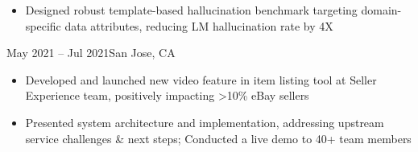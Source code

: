 \begin{itemize}

    \item Designed robust template-based hallucination benchmark targeting domain-specific data attributes,
    reducing LM hallucination rate by 4X



\end{itemize}
\dividerSmall


    {}
    {May 2021 -- Jul 2021}{San Jose, CA}{}
\begin{itemize}

    \item Developed and launched new video feature in item listing tool at Seller Experience team, positively impacting >10\% eBay sellers

    \item Presented system architecture and implementation, addressing upstream service challenges \& next steps;
    Conducted a live demo to 40+ team members \hspace{-0.5em}
\end{itemize}
\dividerSmall



